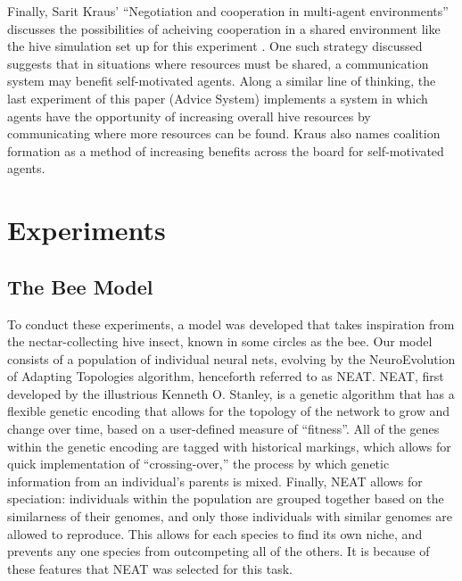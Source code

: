 \documentclass[11pt]{article}
\begin{document}
		Finally, Sarit Kraus' ``Negotiation and cooperation in multi-agent environments'' discusses the possibilities of acheiving cooperation in a shared environment like the hive simulation set up for this experiment \cite{kraus}. One such strategy discussed suggests that in situations where resources must be shared, a communication system may benefit self-motivated agents. Along a similar line of thinking, the last experiment of this paper (Advice System) implements a system in which agents have the opportunity of increasing overall hive resources by communicating where more resources can be found. Kraus also names coalition formation as a method of increasing benefits across the board for self-motivated agents. 



	\section{Experiments} %
	\label{sec:experiments}

		\subsection{The Bee Model} %
		\label{sub:the_bee_model}
			To conduct these experiments, a model was developed that takes inspiration from the nectar-collecting hive insect, known in some circles as the bee. Our model consists of a population of individual neural nets, evolving by the NeuroEvolution of Adapting Topologies algorithm, henceforth referred to as NEAT.\cite{neat} NEAT, first developed by the illustrious Kenneth O. Stanley, is a genetic algorithm that has a flexible genetic encoding that allows for the topology of the network to grow and change over time, based on a user-defined measure of ``fitness''. All of the genes within the genetic encoding are tagged with historical markings, which allows for quick implementation of ``crossing-over,'' the process by which genetic information from an individual's parents is mixed. Finally, NEAT allows for speciation: individuals within the population are grouped together based on the similarness of their genomes, and only those individuals with similar genomes are allowed to reproduce. This allows for each species to find its own niche, and prevents any one species from outcompeting all of the others. It is because of these features that NEAT was selected for this task.
\end{document}
